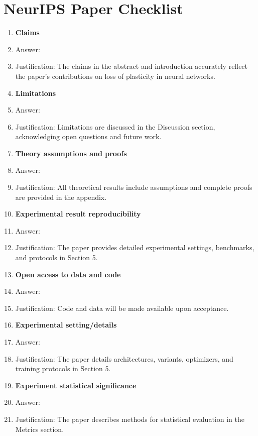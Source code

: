 \documentclass{article}
\begin{document}
\section*{NeurIPS Paper Checklist}
\begin{enumerate}
\item {\bf Claims}
    \item[] Answer: \answerYes{} 
    \item[] Justification: The claims in the abstract and introduction accurately reflect the paper's contributions on loss of plasticity in neural networks.

\item {\bf Limitations}
    \item[] Answer: \answerYes{} 
    \item[] Justification: Limitations are discussed in the Discussion section, acknowledging open questions and future work.

\item {\bf Theory assumptions and proofs}
    \item[] Answer: \answerYes{} 
    \item[] Justification: All theoretical results include assumptions and complete proofs are provided in the appendix.
    
\item {\bf Experimental result reproducibility}
    \item[] Answer: \answerYes{} 
    \item[] Justification: The paper provides detailed experimental settings, benchmarks, and protocols in Section 5.

\item {\bf Open access to data and code}
    \item[] Answer: \answerYes{} 
    \item[] Justification: Code and data will be made available upon acceptance.

\item {\bf Experimental setting/details}
    \item[] Answer: \answerYes{} 
    \item[] Justification: The paper details architectures, variants, optimizers, and training protocols in Section 5.

\item {\bf Experiment statistical significance}
    \item[] Answer: \answerYes{} 
    \item[] Justification: The paper describes methods for statistical evaluation in the Metrics section.


\end{enumerate}
\end{document}
